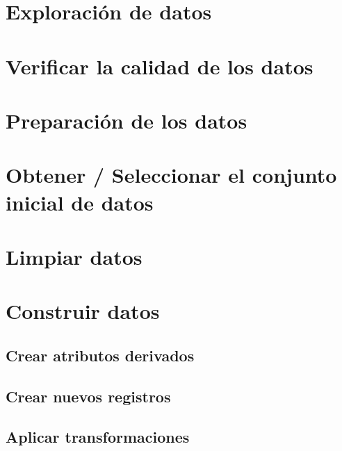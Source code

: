 \documentclass[11pt,a4paper,twoside]{tesis}
\begin{document}
\section{Exploración de datos}
\section{Verificar la calidad de los datos}

\section{Preparación de los datos}
\section{Obtener / Seleccionar el conjunto inicial de datos}
\section{Limpiar datos}
\section{Construir datos}
\subsection{Crear atributos derivados}
\subsection{Crear nuevos registros}
\subsection{Aplicar transformaciones}
\end{document}
